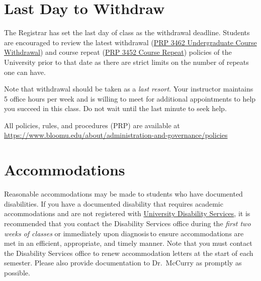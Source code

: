 \documentclass[11pt,letterpaper]{article}
\begin{document}
%

\section{Last Day to Withdraw}
The Registrar has set the last day of class as the withdrawal deadline.
Students are encouraged to review the latest withdrawal
(\href{https://www.bloomu.edu/prp-3462-undergraduate-course-withdrawal}{PRP 3462 Undergraduate
Course Withdrawal}) and course repeat
(\href{https://www.bloomu.edu/prp-3452-course-repeat}{PRP 3452 Course
Repeat}) policies of the
University prior to that date as there are strict limits on the number of
repeats one can have. 

Note that withdrawal should be taken as a \emph{last resort}. Your instructor
maintains 5 office hours per week and is willing to meet for additional
appointments to help you succeed in this class. Do not wait until the last minute to seek help.

\begin{mdframed}
	\centering
	All policies, rules, and procedures (PRP) are available at
	\url{https://www.bloomu.edu/about/administration-and-governance/policies}
\end{mdframed}

\section{Accommodations}
Reasonable accommodations may be made to students who have documented
disabilities. If you have a documented disability that requires academic
accommodations and are not registered with
\href{https://bloomu.prod.acquia-sites.com/offices-directory/disability-services}{University
Disability Services}, it is recommended that you contact the Disability Services office during
the \textit{first two weeks of classes} or immediately upon diagnosis to ensure
accommodations are met in an efficient, appropriate, and timely manner.
Note that you must contact the Disability Services office to renew accommodation
letters at the start of each semester. Please also provide documentation to Dr.\
McCurry as promptly as possible.
\end{document}
